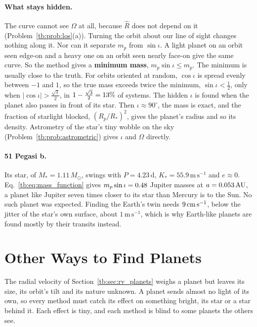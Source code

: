 \paragraph{What stays hidden.} The curve cannot see $\Omega$ at all, because $\hat R$ does not depend on it (Problem~\ref{tb:prob:los}(a)). Turning the orbit about our line of sight changes nothing along it. Nor can it separate $m_p$ from $\sin\iota$. A light planet on an orbit seen edge-on and a heavy one on an orbit seen nearly face-on give the same curve. So the method gives a \textbf{minimum mass}, $m_p\sin\iota\le m_p$. The minimum is usually close to the truth. For orbits oriented at random, $\cos\iota$ is spread evenly between $-1$ and $1$, so the true mass exceeds twice the minimum, $\sin\iota<\tfrac12$, only when $|\cos\iota|>\tfrac{\sqrt3}{2}$, in $1-\tfrac{\sqrt3}{2}=13\%$ of systems. The hidden $\iota$ is found when the planet also passes in front of its star. Then $\iota\approx90^\circ$, the mass is exact, and the fraction of starlight blocked, $(R_p/R_*)^2$, gives the planet's radius and so its density. Astrometry of the star's tiny wobble on the sky (Problem~\ref{tb:prob:astrometric}) gives $\iota$ and $\Omega$ directly.

\paragraph{51 Pegasi b.} Its star, of $M_*=1.11\,M_\odot$, swings with $P=4.23\,\mathrm d$, $K_*=55.9\,\mathrm{m\,s^{-1}}$ and $e\approx0$. Eq.~\eqref{tb:eq:mass_function} gives $m_p\sin\iota=0.48$ Jupiter masses at $a=0.053\,\mathrm{AU}$, a planet like Jupiter seven times closer to its star than Mercury is to the Sun. No such planet was expected. Finding the Earth's twin needs $9\,\mathrm{cm\,s^{-1}}$, below the jitter of the star's own surface, about $1\,\mathrm{m\,s^{-1}}$, which is why Earth-like planets are found mostly by their transits instead.

\section{Other Ways to Find Planets}
\label{tb:sec:planet_methods}

The radial velocity of Section~\ref{tb:sec:rv_planets} weighs a planet but leaves its size, its orbit's tilt and its nature unknown. A planet sends almost no light of its own, so every method must catch its effect on something bright, its star or a star behind it. Each effect is tiny, and each method is blind to some planets the others see.

